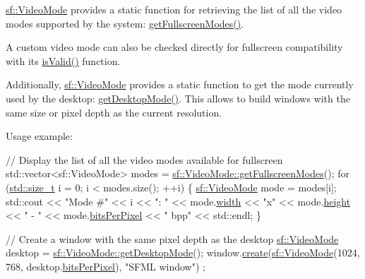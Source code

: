 \hyperlink{classsf_1_1_video_mode}{sf\-::\-Video\-Mode} provides a static function for retrieving the list of all the video modes supported by the system\-: \hyperlink{classsf_1_1_video_mode_a6815b9b3b35767d5b4563fbed4bfc67b}{get\-Fullscreen\-Modes()}.

A custom video mode can also be checked directly for fullscreen compatibility with its \hyperlink{classsf_1_1_video_mode_aa64ff5420dde3b31c24b9c4e2be9cd9c}{is\-Valid()} function.

Additionally, \hyperlink{classsf_1_1_video_mode}{sf\-::\-Video\-Mode} provides a static function to get the mode currently used by the desktop\-: \hyperlink{classsf_1_1_video_mode_ac1be160a4342e6eafb2cb0e8c9b18d44}{get\-Desktop\-Mode()}. This allows to build windows with the same size or pixel depth as the current resolution.

Usage example\-: 
\begin{DoxyCode}
\textcolor{comment}{// Display the list of all the video modes available for fullscreen}
std::vector<sf::VideoMode> modes = \hyperlink{classsf_1_1_video_mode_a6815b9b3b35767d5b4563fbed4bfc67b}{sf::VideoMode::getFullscreenModes}();
\textcolor{keywordflow}{for} (\hyperlink{curses_8priv_8h_ae43e1afb4123c6ddee091cf03ec10266}{std::size\_t} i = 0; i < modes.size(); ++i)
\{
    \hyperlink{classsf_1_1_video_mode}{sf::VideoMode} mode = modes[i];
    std::cout << \textcolor{stringliteral}{"Mode #"} << i << \textcolor{stringliteral}{": "}
              << mode.\hyperlink{classsf_1_1_video_mode_a9b3b2ad2cac6b9c266823fb5ed506d90}{width} << \textcolor{stringliteral}{"x"} << mode.\hyperlink{classsf_1_1_video_mode_a5a88d44c9470db7474361a42a189342d}{height} << \textcolor{stringliteral}{" - "}
              << mode.\hyperlink{classsf_1_1_video_mode_aa080f1ef96a1008d58b1920eceb189df}{bitsPerPixel} << \textcolor{stringliteral}{" bpp"} << std::endl;
\}

\textcolor{comment}{// Create a window with the same pixel depth as the desktop}
\hyperlink{classsf_1_1_video_mode}{sf::VideoMode} desktop = \hyperlink{classsf_1_1_video_mode_ac1be160a4342e6eafb2cb0e8c9b18d44}{sf::VideoMode::getDesktopMode}();
window.\hyperlink{classsf_1_1_window_a30e6edf2162f8dbff61023b9de5d961d}{create}(\hyperlink{classsf_1_1_video_mode}{sf::VideoMode}(1024, 768, desktop.\hyperlink{classsf_1_1_video_mode_aa080f1ef96a1008d58b1920eceb189df}{bitsPerPixel}), \textcolor{stringliteral}{"SFML window"})
      ;
\end{DoxyCode}
 

